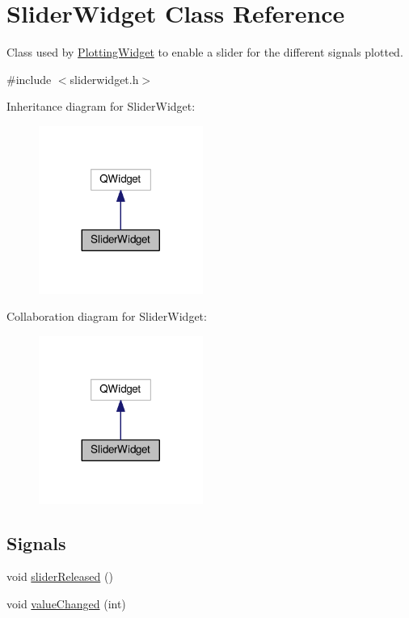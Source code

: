 \hypertarget{classSliderWidget}{}\section{Slider\+Widget Class Reference}
\label{classSliderWidget}


Class used by \hyperlink{classPlottingWidget}{Plotting\+Widget} to enable a slider for the different signals plotted.  




{\ttfamily \#include $<$sliderwidget.\+h$>$}



Inheritance diagram for Slider\+Widget\+:\nopagebreak
\begin{figure}[H]
\begin{center}
\leavevmode
\includegraphics[width=152pt]{classSliderWidget__inherit__graph}
\end{center}
\end{figure}


Collaboration diagram for Slider\+Widget\+:\nopagebreak
\begin{figure}[H]
\begin{center}
\leavevmode
\includegraphics[width=152pt]{classSliderWidget__coll__graph}
\end{center}
\end{figure}
\subsection*{Signals}
\begin{DoxyCompactItemize}
\item 
void \hyperlink{classSliderWidget_aa109c6305bc6e78efe3091982e787325}{slider\+Released} ()
\item 
void \hyperlink{classSliderWidget_a23048ce6bec593c2b4d932293b055fa7}{value\+Changed} (int)
\end{DoxyCompactItemize}
